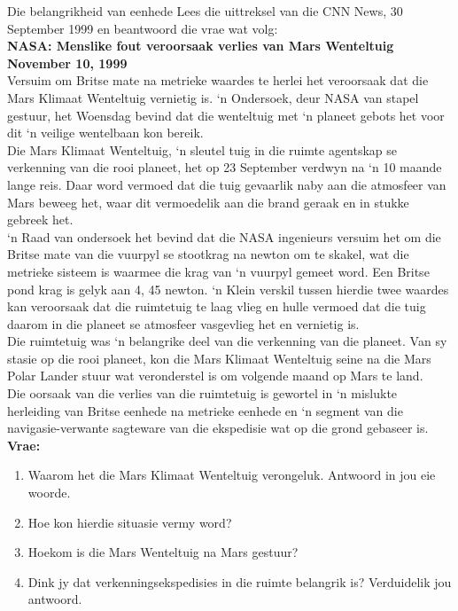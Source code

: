\begin{casestudy}{Die belangrikheid van eenhede}
            \nopagebreak
Lees die uittreksel van die CNN News, 30 September 1999 en beantwoord die vrae wat volg:\\
\textbf{NASA: Menslike fout veroorsaak verlies van Mars Wenteltuig November 10, 1999}\\
Versuim om Britse mate na metrieke waardes te herlei het veroorsaak dat die Mars Klimaat Wenteltuig vernietig is. ‘n Ondersoek, deur NASA van stapel gestuur, het Woensdag bevind dat die wenteltuig met ‘n planeet gebots het voor dit ‘n veilige wentelbaan kon bereik.\\
Die Mars Klimaat Wenteltuig, ‘n sleutel tuig in die ruimte agentskap se verkenning van die rooi planeet, het op 23 September verdwyn na ‘n 10 maande lange reis. Daar word vermoed dat die tuig gevaarlik naby aan die atmosfeer van Mars beweeg het, waar dit vermoedelik aan die brand geraak en in stukke gebreek het.\\
‘n Raad van ondersoek het bevind dat die NASA ingenieurs versuim het om die Britse mate van die vuurpyl se stootkrag na newton om te skakel, wat die metrieke sisteem is waarmee die krag van ‘n vuurpyl gemeet word. Een Britse pond krag is gelyk aan 4, 45 newton. ‘n Klein verskil tussen hierdie twee waardes kan veroorsaak dat die ruimtetuig te laag vlieg en hulle vermoed dat die tuig daarom in die planeet se atmosfeer vasgevlieg het en vernietig is.\\
Die ruimtetuig was ‘n belangrike deel van die verkenning van die planeet. Van sy stasie op die rooi planeet, kon die Mars Klimaat Wenteltuig seine na die Mars Polar Lander stuur wat veronderstel is om volgende maand op Mars te land.\\
Die oorsaak van die verlies van die ruimtetuig is gewortel in ‘n mislukte herleiding van Britse eenhede na metrieke eenhede en ‘n segment van die navigasie-verwante sagteware van die ekspedisie wat op die grond gebaseer is.\\
\textbf{Vrae:}\\
\begin{enumerate}[noitemsep, label=\textbf{\arabic*}. ] 
\item Waarom het die Mars Klimaat Wenteltuig verongeluk. Antwoord in  jou eie woorde.
\item Hoe kon hierdie situasie vermy word?
\item Hoekom is die Mars Wenteltuig na Mars gestuur?
\item Dink jy dat verkenningsekspedisies in die ruimte belangrik is? Verduidelik jou antwoord.
\end{enumerate}
\end{casestudy}
